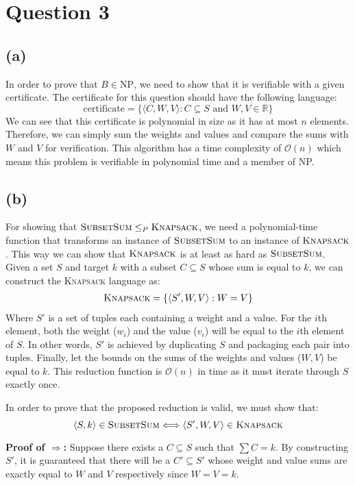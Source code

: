 \section{Question 3}
\subsection{(a)}
In order to prove that $B \in \text{NP}$, we need to show that it is verifiable with a given certificate.
The certificate for this question should have the following language:
\[\text{certificate}=\{\langle C, W, V \rangle : C \subseteq S \text{ and } W,V \in \mathbb{R}\}\]
We can see that this certificate is polynomial in size as it has at most $n$ elements. Therefore, we can simply sum the weights and values and compare the sums with $W$ and $V$ for verification. This algorithm has a time complexity of $\mathcal{O}(n)$ which means
this problem is verifiable in polynomial time and a member of NP.
\subsection{(b)}
For showing that $\textsc{SubsetSum} \leq_P \textsc{Knapsack}$, we need a polynomial-time function that transforms an instance of $\textsc{SubsetSum}$ to an instance of $\textsc{Knapsack}$.
This way we can show that $\textsc{Knapsack}$ is at least as hard as $\textsc{SubsetSum}$. Given a set $S$ and target $k$ with a subset $C \subseteq S$ whose sum is equal to $k$, we can construct the \textsc{Knapsack} language as:
\begin{equation}
    \begin{aligned}
        \textsc{Knapsack}=\{\langle S', W, V \rangle : W = V\}
    \end{aligned}
\end{equation}
Where $S'$ is a set of tuples each containing a weight and a value.
For the $i$th element, both the weight ($w_i$) and the value ($v_i$) will be equal to the $i$th element of $S$.
In other words, $S'$ is achieved by duplicating $S$ and packaging each pair into tuples.
Finally, let the bounds on the sums of the weights and values ($W, V$) be equal to $k$.
This reduction function is $\mathcal{O}(n)$ in time
as it must iterate through $S$ exactly once.

In order to prove that the proposed reduction is valid, we must show that:
\[\langle S, k \rangle \in \textsc{SubsetSum} \Longleftrightarrow \langle S', W, V \rangle \in \textsc{Knapsack}\]

\textbf{Proof of $\Rightarrow$:}
Suppose there exists a $C \subseteq S$ such that $\sum C = k$. By constructing $S'$, it is guaranteed that there will be a $C' \subseteq S'$ whose
weight and value sums are exactly equal to $W$ and $V$ respectively since $W = V = k$.

